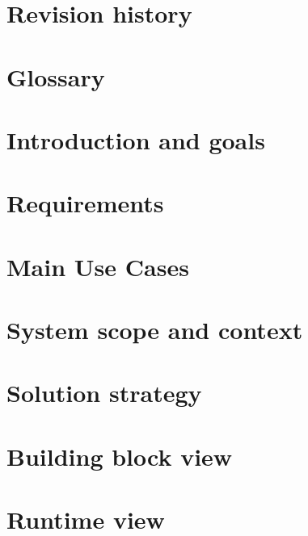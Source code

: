 \documentclass[11pt, oneside]{book}
\begin{document}


\frontmatter

\chapter{Revision history}
\label{chp:rev_his}




\chapter{Glossary}
\label{chp:glos}


\mainmatter

\chapter{Introduction and goals}
\label{chp:intro}


\chapter{Requirements}
\label{chp:requirements}


\chapter{Main Use Cases}
\label{chp:usecases}


\chapter{System scope and context}
\label{chp:syst_context}


\chapter{Solution strategy}
\label{chp:sol_strategy}


\chapter{Building block view}
\label{chp:build_block}


\chapter{Runtime view}
\label{chp:runtime}

\end{document}
